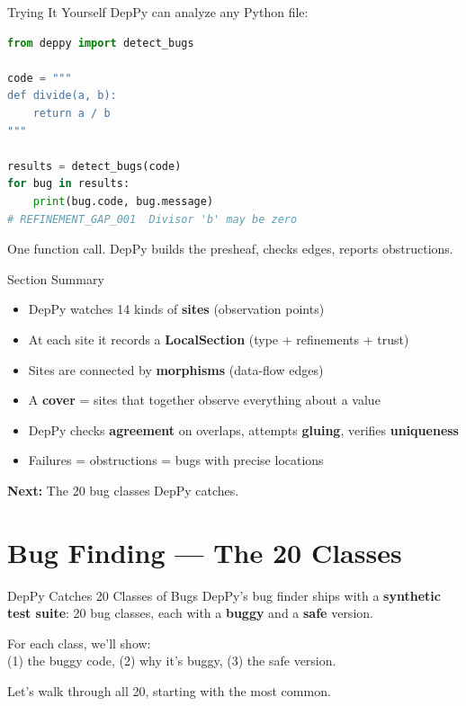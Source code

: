 \documentclass[aspectratio=169,10pt]{beamer}
\begin{document}
\begin{frame}[fragile]{Trying It Yourself}
DepPy can analyze any Python file:
\vspace{0.3em}
\begin{lstlisting}[language=Python, basicstyle=\ttfamily\scriptsize]
from deppy import detect_bugs

code = """
def divide(a, b):
    return a / b
"""

results = detect_bugs(code)
for bug in results:
    print(bug.code, bug.message)
# REFINEMENT_GAP_001  Divisor 'b' may be zero
\end{lstlisting}
\vspace{0.3em}
One function call. DepPy builds the presheaf, checks edges, reports obstructions.
\end{frame}

\begin{frame}{Section Summary}
\begin{itemize}
  \item DepPy watches 14 kinds of \textbf{sites} (observation points)
  \item At each site it records a \textbf{LocalSection} (type + refinements + trust)
  \item Sites are connected by \textbf{morphisms} (data-flow edges)
  \item A \textbf{cover} = sites that together observe everything about a value
  \item DepPy checks \textbf{agreement} on overlaps, attempts \textbf{gluing}, verifies \textbf{uniqueness}
  \item Failures = obstructions = bugs with precise locations
\end{itemize}
\vspace{0.3em}
\begin{center}
\textbf{Next:} The 20 bug classes DepPy catches.
\end{center}
\end{frame}

\section{Bug Finding --- The 20 Classes}

\begin{frame}{DepPy Catches 20 Classes of Bugs}
DepPy's bug finder ships with a \textbf{synthetic test suite}: 20 bug classes, each with a \textbf{buggy} and a \textbf{safe} version.
\vspace{0.3em}
\begin{center}
For each class, we'll show:\\
(1) the buggy code, (2) why it's buggy, (3) the safe version.
\end{center}
\vspace{0.3em}
Let's walk through all 20, starting with the most common.
\end{frame}
\end{document}
